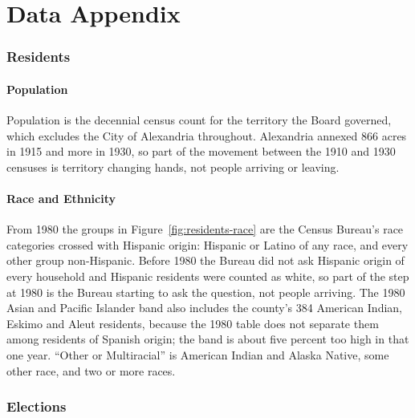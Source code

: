\part{Data Appendix}
\sectionbreaksfalse

\section{Residents}

\subsection{Population}
Population is the decennial census count for the territory the Board governed, which
excludes the City of Alexandria throughout. Alexandria annexed 866 acres in 1915 and
more in 1930, so part of the movement between the 1910 and 1930 censuses is territory
changing hands, not people arriving or leaving.

\subsection{Race and Ethnicity}
From 1980 the groups in Figure~\ref{fig:residents-race} are the Census Bureau's race
categories crossed with Hispanic origin: Hispanic or Latino of any race, and every other
group non-Hispanic. Before 1980 the Bureau did not ask Hispanic origin of every household
and Hispanic residents were counted as white, so part of the step at 1980 is the Bureau starting to ask the question,
not people arriving. The 1980 Asian and Pacific Islander band also includes the
county's 384 American Indian, Eskimo and Aleut residents, because the 1980 table does not
separate them among residents of Spanish origin; the band is about five percent too high
in that one year.
``Other or Multiracial'' is American Indian and Alaska Native, some other race, and two or
more races.

\section{Elections}

